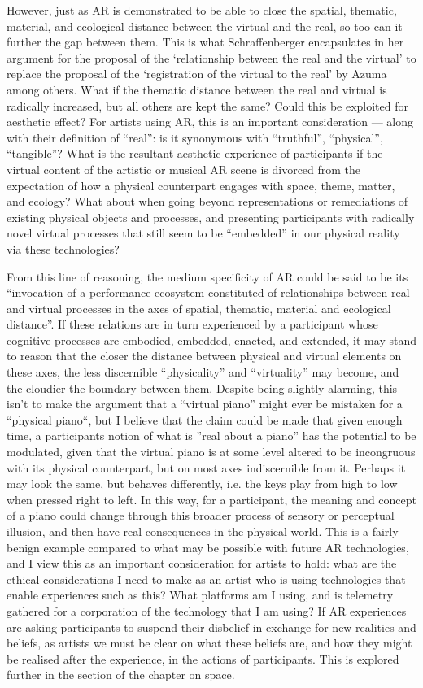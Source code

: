 However, just as AR is demonstrated to be able to close the spatial, thematic, material, and ecological distance between the virtual and the real, so too can it further the gap between them. This is what Schraffenberger encapsulates in her argument for the proposal of the ‘relationship between the real and the virtual’ to replace the proposal of the ‘registration of the virtual to the real’ by Azuma among others. What if the thematic distance between the real and virtual is radically increased, but all others are kept the same? Could this be exploited for aesthetic effect? For artists using AR, this is an important consideration — along with their definition of “real”: is it synonymous with “truthful”, “physical”, “tangible”? What is the resultant aesthetic experience of participants if the virtual content of the artistic or musical AR scene is divorced from the expectation of how a physical counterpart engages with space, theme, matter, and ecology? What about when going beyond representations or remediations of existing physical objects and processes, and presenting participants with radically novel virtual processes that still seem to be “embedded” in our physical reality via these technologies?

From this line of reasoning, the medium specificity of AR could be said to be its “invocation of a performance ecosystem constituted of relationships between real and virtual processes in the axes of spatial, thematic, material and ecological distance”. If these relations are in turn experienced by a participant whose cognitive processes are embodied, embedded, enacted, and extended, it may stand to reason that the closer the distance between physical and virtual elements on these axes, the less discernible “physicality” and “virtuality” may become, and the cloudier the boundary between them. Despite being slightly alarming, this isn’t to make the argument that a “virtual piano” might ever be mistaken for a “physical piano“, but I believe that the claim could be made that given enough time, a participants notion of what is ”real about a piano” has the potential to be modulated, given that the virtual piano is at some level altered to be incongruous with its physical counterpart, but on most axes indiscernible from it. Perhaps it may look the same, but behaves differently, i.e. the keys play from high to low when pressed right to left. In this way, for a participant, the meaning and concept of a piano could change through this broader process of sensory or perceptual illusion, and then have real consequences in the physical world. This is a fairly benign example compared to what may be possible with future AR technologies, and I view this as an important consideration for artists to hold: what are the ethical considerations I need to make as an artist who is using technologies that enable experiences such as this? What platforms am I using, and is telemetry gathered for a corporation of the technology that I am using? If AR experiences are asking participants to suspend their disbelief in exchange for new realities and beliefs, as artists we must be clear on what these beliefs are, and how they might be realised after the experience, in the actions of participants. This is explored further in the section of the chapter on space.

